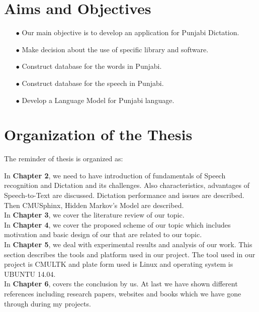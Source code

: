 \documentclass[12pt,a4paper,oldfontcommands]{memoir}
\begin{document}
\section{Aims and Objectives}

\begin{itemize}
  \item[$\bullet$] Our main objective is to develop an application for Punjabi Dictation.
  \item[$\bullet$] Make decision about the use of specific library and software.
  \item[$\bullet$] Construct database for the words in Punjabi. 
  \item[$\bullet$] Construct database for the speech in Punjabi. 
  \item[$\bullet$] Develop a Language Model for Punjabi language.	
\end{itemize}

\section{Organization of the Thesis}
The reminder of thesis is organized as:

In \textbf{Chapter 2}, we need to have introduction of fundamentals of Speech recognition and Dictation and its challenges. Also characteristics, advantages of Speech-to-Text are discussed. Dictation performance and issues are described. Then CMUSphinx, Hidden Markov's Model are described.\\

In \textbf{Chapter 3}, we cover the literature review of our topic.\\


In \textbf{Chapter 4}, we cover the proposed scheme of our topic which includes motivation and basic design of our that are related to our topic.\\


In \textbf{Chapter 5}, we deal with experimental results and analysis of our work. This section describes the tools and platform used in our project.
The tool used in our project is CMULTK and plate form used is Linux and operating system is UBUNTU 14.04.\\


In \textbf{Chapter 6}, covers the conclusion by us. At last we have shown different references including research papers, websites and books which we have gone through during my projects. 
\end{document}
